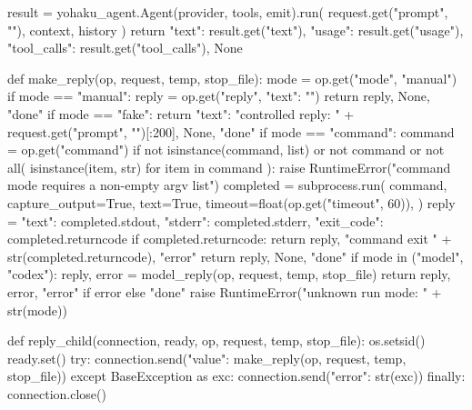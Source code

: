     result = yohaku_agent.Agent(provider, tools, emit).run(
        request.get("prompt", ""), context, history
    )
    return {"text": result.get("text"), "usage": result.get("usage"),
            "tool_calls": result.get("tool_calls")}, None


def make_reply(op, request, temp, stop_file):
    mode = op.get("mode", "manual")
    if mode == "manual":
        reply = op.get("reply", {"text": ""})
        return reply, None, "done"
    if mode == "fake":
        return {"text": "controlled reply: " + request.get("prompt", "")[:200]}, None, "done"
    if mode == "command":
        command = op.get("command")
        if not isinstance(command, list) or not command or not all(
            isinstance(item, str) for item in command
        ):
            raise RuntimeError("command mode requires a non-empty argv list")
        completed = subprocess.run(
            command, capture_output=True, text=True,
            timeout=float(op.get("timeout", 60)),
        )
        reply = {"text": completed.stdout, "stderr": completed.stderr,
                 "exit_code": completed.returncode}
        if completed.returncode:
            return reply, "command exit " + str(completed.returncode), "error"
        return reply, None, "done"
    if mode in ("model", "codex"):
        reply, error = model_reply(op, request, temp, stop_file)
        return reply, error, "error" if error else "done"
    raise RuntimeError("unknown run mode: " + str(mode))


def reply_child(connection, ready, op, request, temp, stop_file):
    os.setsid()
    ready.set()
    try:
        connection.send({"value": make_reply(op, request, temp, stop_file)})
    except BaseException as exc:
        connection.send({"error": str(exc)})
    finally:
        connection.close()


